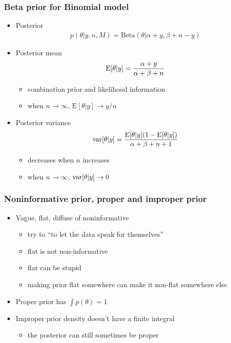 \documentclass[10pt,handout]{beamer}
\begin{document}
\begin{frame}
  \frametitle{Beta prior for Binomial model}

  \begin{itemize}
  \item Posterior
    \baselineskip
    \begin{align*}
      p(\theta|y,n,M) = \text{Beta}(\theta|\alpha+y,\beta+n-y)
    \end{align*}
    \item Posterior mean
    \baselineskip
    \begin{align*}
      \mathrm{E}[\theta|y] = \frac{\alpha+y}{\alpha+\beta+n}
    \end{align*}
    \begin{itemize}
    \item combination prior and likelihood information
    \item when $n\rightarrow\infty$, $\text{E}[\theta|y]\rightarrow y/n$
    \end{itemize}
    \pause
  \item  Posterior variance
    \baselineskip
    \begin{align*}
      \mathrm{var}[\theta|y]=\frac{\mathrm{E}[\theta|y](1-\mathrm{E}[\theta|y])}{\alpha+\beta+n+1}
    \end{align*}
    \begin{itemize}
    \item decreases when $n$ increases
    \item when $n\rightarrow\infty$, $\mathrm{var}[\theta|y]\rightarrow 0$
    \end{itemize}
  \end{itemize}

\end{frame}

\begin{frame}

  \frametitle{Noninformative prior, proper and improper prior}

  \begin{itemize}
  \item Vague, flat, diffuse of noninformative
    \begin{itemize}
    \item try to ``to let the data speak for themselves''
    \item flat is not non-informative
    \item flat can be stupid
    \item making prior flat somewhere can make it non-flat somewhere
      else
    \end{itemize}
  \item Proper prior has $\int p(\theta) = 1$
  \item Improper prior density doesn't have a finite integral
    \begin{itemize}
    \item the posterior can still sometimes be proper
    \end{itemize}
  \end{itemize}

\end{frame}
\end{document}
